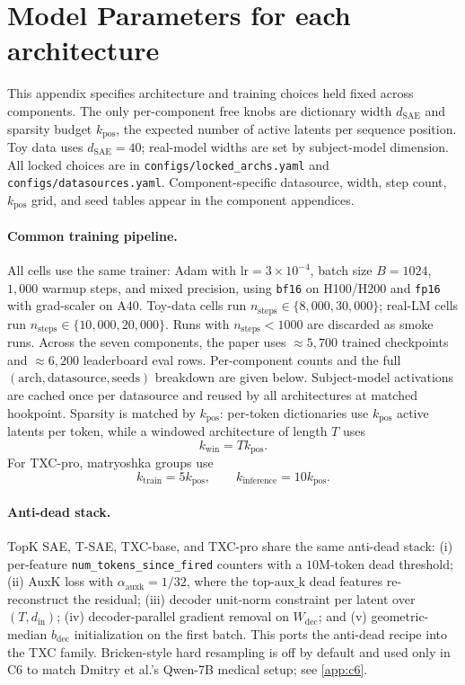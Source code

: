 \appendix

\section{Model Parameters for each architecture}
\label{app:model-params}

This appendix specifies architecture and training choices held fixed across components. The only per-component free knobs are dictionary width $d_{\mathrm{SAE}}$ and sparsity budget $k_{\mathrm{pos}}$, the expected number of active latents per sequence position. Toy data uses $d_{\mathrm{SAE}}=40$; real-model widths are set by subject-model dimension. All locked choices are in \texttt{configs/locked\_archs.yaml} and \texttt{configs/datasources.yaml}. Component-specific datasource, width, step count, $k_{\mathrm{pos}}$ grid, and seed tables appear in the component appendices.

\paragraph{Common training pipeline.}
All cells use the same trainer: Adam with $\mathrm{lr}=3{\times}10^{-4}$, batch size $B=1024$, $1{,}000$ warmup steps, and mixed precision, using \texttt{bf16} on H100/H200 and \texttt{fp16} with grad-scaler on A40. Toy-data cells run $n_{\mathrm{steps}}\in\{8{,}000,30{,}000\}$; real-LM cells run $n_{\mathrm{steps}}\in\{10{,}000,20{,}000\}$. Runs with $n_{\mathrm{steps}}<1000$ are discarded as smoke runs. Across the seven components, the paper uses $\approx5{,}700$ trained checkpoints and $\approx6{,}200$ leaderboard eval rows. Per-component counts and the full $(\text{arch},\text{datasource},\text{seeds})$ breakdown are given below. Subject-model activations are cached once per datasource and reused by all architectures at matched hookpoint. Sparsity is matched by $k_{\mathrm{pos}}$: per-token dictionaries use $k_{\mathrm{pos}}$ active latents per token, while a windowed architecture of length $T$ uses
\[
    k_{\mathrm{win}}=T k_{\mathrm{pos}}.
\]
For TXC-pro, matryoshka groups use
\[
    k_{\mathrm{train}}=5k_{\mathrm{pos}},
    \qquad
    k_{\mathrm{inference}}=10k_{\mathrm{pos}}.
\]

\paragraph{Anti-dead stack.}
TopK SAE, T-SAE, TXC-base, and TXC-pro share the same anti-dead stack: (i) per-feature \texttt{num\_tokens\_since\_fired} counters with a $10$M-token dead threshold; (ii) AuxK loss with $\alpha_{\mathrm{auxk}}=1/32$, where the top-$\mathrm{aux\_k}$ dead features re-reconstruct the residual; (iii) decoder unit-norm constraint per latent over $(T,d_{\mathrm{in}})$; (iv) decoder-parallel gradient removal on $W_{\mathrm{dec}}$; and (v) geometric-median $b_{\mathrm{dec}}$ initialization on the first batch. This ports the \citet{bhalla2025temporal} anti-dead recipe into the TXC family. Bricken-style hard resampling \citep{templeton2023scaling} is off by default and used only in C6 to match Dmitry et al.'s Qwen-7B medical setup; see \cref{app:c6}.

